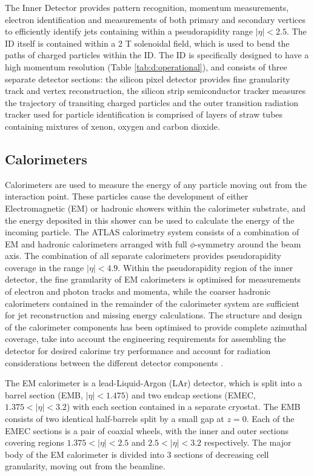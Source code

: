 		The Inner Detector provides pattern recognition, momentum measurements, electron identification and measurements of both primary and secondary vertices to efficiently identify jets containing \bhadron within a pseudorapidity range $|\eta|<2.5$. The ID itself is contained within a 2 T solenoidal field, which is used to bend the paths of charged particles within the ID. The ID is specifically designed to have a high momentum resolution (Table \ref{tab:d:operational}), and consists of three separate detector sections: the silicon pixel detector provides fine granularity track and vertex reconstruction, the silicon strip semiconductor tracker measures the trajectory of transiting charged particles and the outer transition radiation tracker used for particle identification is comprised of layers of straw tubes containing mixtures of xenon, oxygen and carbon dioxide.

	\subsection{Calorimeters}

		Calorimeters are used to measure the energy of any particle moving out from the interaction point. These particles cause the development of either Electromagnetic (EM) or hadronic showers within the calorimeter substrate, and the energy deposited in this shower can be used to calculate the energy of the incoming particle. The ATLAS calorimetry system consists of a combination of EM and hadronic calorimeters arranged with full $\phi$-symmetry around the beam axis. The combination of all separate calorimeters provides pseudorapidity coverage in the range $|\eta| < 4.9$. Within the pseudorapidity region of the inner detector, the fine granularity of EM calorimeters is optimised for measurements of electron and photon tracks and momenta, while the coarser hadronic calorimeters contained in the remainder of the calorimeter system are sufficient for jet reconstruction and missing energy calculations. The structure and design of the calorimeter components has been optimised to provide complete azimuthal coverage, take into account the engineering requirements for assembling the detector for desired calorime try performance and account for radiation considerations between the different detector components \cite{ATLAS}.

		The EM calorimeter is a lead-Liquid-Argon (LAr) detector, which is split into a barrel section (EMB, $|\eta|<1.475$) and two endcap sections (EMEC, $1.375<|\eta|<3.2$) with each section contained in a separate cryostat. The EMB consists of two identical half-barrels split by a small gap at $z=0$. Each of the EMEC sections is a pair of coaxial wheels, with the inner and outer sections covering regions $1.375<|\eta|<2.5$ and $2.5<|\eta|<3.2$ respectively. The major body of the EM calorimeter is divided into 3 sections of decreasing cell granularity, moving out from the beamline.

